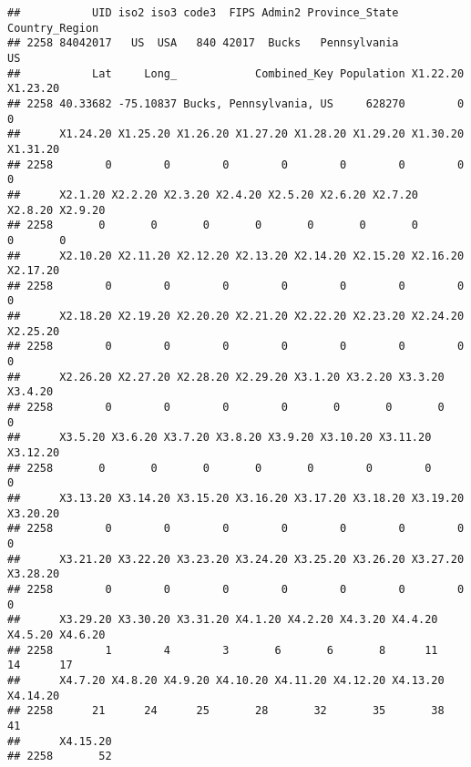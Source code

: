 \documentclass[]{article}
\newenvironment{Shaded}{\begin{snugshade}}{\end{snugshade}}
\newcommand{\KeywordTok}[1]{\textcolor[rgb]{0.13,0.29,0.53}{\textbf{{#1}}}}
\newcommand{\DataTypeTok}[1]{\textcolor[rgb]{0.13,0.29,0.53}{{#1}}}
\newcommand{\StringTok}[1]{\textcolor[rgb]{0.31,0.60,0.02}{{#1}}}
\newcommand{\NormalTok}[1]{{#1}}
\begin{document}
\begin{verbatim}
##           UID iso2 iso3 code3  FIPS Admin2 Province_State Country_Region
## 2258 84042017   US  USA   840 42017  Bucks   Pennsylvania             US
##           Lat     Long_            Combined_Key Population X1.22.20 X1.23.20
## 2258 40.33682 -75.10837 Bucks, Pennsylvania, US     628270        0        0
##      X1.24.20 X1.25.20 X1.26.20 X1.27.20 X1.28.20 X1.29.20 X1.30.20 X1.31.20
## 2258        0        0        0        0        0        0        0        0
##      X2.1.20 X2.2.20 X2.3.20 X2.4.20 X2.5.20 X2.6.20 X2.7.20 X2.8.20 X2.9.20
## 2258       0       0       0       0       0       0       0       0       0
##      X2.10.20 X2.11.20 X2.12.20 X2.13.20 X2.14.20 X2.15.20 X2.16.20 X2.17.20
## 2258        0        0        0        0        0        0        0        0
##      X2.18.20 X2.19.20 X2.20.20 X2.21.20 X2.22.20 X2.23.20 X2.24.20 X2.25.20
## 2258        0        0        0        0        0        0        0        0
##      X2.26.20 X2.27.20 X2.28.20 X2.29.20 X3.1.20 X3.2.20 X3.3.20 X3.4.20
## 2258        0        0        0        0       0       0       0       0
##      X3.5.20 X3.6.20 X3.7.20 X3.8.20 X3.9.20 X3.10.20 X3.11.20 X3.12.20
## 2258       0       0       0       0       0        0        0        0
##      X3.13.20 X3.14.20 X3.15.20 X3.16.20 X3.17.20 X3.18.20 X3.19.20 X3.20.20
## 2258        0        0        0        0        0        0        0        0
##      X3.21.20 X3.22.20 X3.23.20 X3.24.20 X3.25.20 X3.26.20 X3.27.20 X3.28.20
## 2258        0        0        0        0        0        0        0        0
##      X3.29.20 X3.30.20 X3.31.20 X4.1.20 X4.2.20 X4.3.20 X4.4.20 X4.5.20 X4.6.20
## 2258        1        4        3       6       6       8      11      14      17
##      X4.7.20 X4.8.20 X4.9.20 X4.10.20 X4.11.20 X4.12.20 X4.13.20 X4.14.20
## 2258      21      24      25       28       32       35       38       41
##      X4.15.20
## 2258       52
\end{verbatim}

\begin{Shaded}
\end{Shaded}
\end{document}

